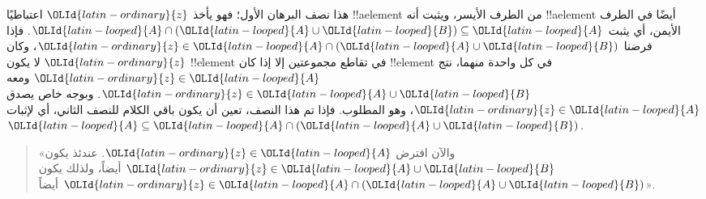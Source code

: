 \documentclass[../../../include/open-logic-section]{subfiles}
\begin{document}
هذا نصف البرهان الأول؛ فهو يأخذ ${\OLId{latin-ordinary}{z}}$ اعتباطيًا !!a{element} من الطرف
الأيسر، ويثبت أنه !!a{element} أيضًا في الطرف الأيمن، أي يثبت
${\OLId{latin-looped}{A}} \cap ({\OLId{latin-looped}{A}} \cup {\OLId{latin-looped}{B}}) \subseteq {\OLId{latin-looped}{A}}$. فإذا فرضنا
${\OLId{latin-ordinary}{z}} \in {\OLId{latin-looped}{A}} \cap ({\OLId{latin-looped}{A}} \cup {\OLId{latin-looped}{B}})$، وكان ${\OLId{latin-ordinary}{z}}$ لا يكون !!{element} في تقاطع
مجموعتين إلا إذا كان !!{element} في كل واحدة منهما، نتج
${\OLId{latin-ordinary}{z}} \in {\OLId{latin-looped}{A}}$ ومعه ${\OLId{latin-ordinary}{z}} \in {\OLId{latin-looped}{A}} \cup {\OLId{latin-looped}{B}}$. وبوجه خاص يصدق ${\OLId{latin-ordinary}{z}} \in {\OLId{latin-looped}{A}}$، وهو
المطلوب. فإذا تم هذا النصف، تعين أن يكون باقي الكلام للنصف الثاني، أي
لإثبات
${\OLId{latin-looped}{A}} \subseteq {\OLId{latin-looped}{A}} \cap ({\OLId{latin-looped}{A}} \cup {\OLId{latin-looped}{B}})$.

\begin{quote}
«والآن افترض ${\OLId{latin-ordinary}{z}} \in {\OLId{latin-looped}{A}}$. عندئذ يكون ${\OLId{latin-ordinary}{z}} \in {\OLId{latin-looped}{A}} \cup {\OLId{latin-looped}{B}}$ أيضاً، ولذلك يكون
${\OLId{latin-ordinary}{z}} \in {\OLId{latin-looped}{A}} \cap ({\OLId{latin-looped}{A}} \cup {\OLId{latin-looped}{B}})$ أيضاً».
\end{quote}
\end{document}
